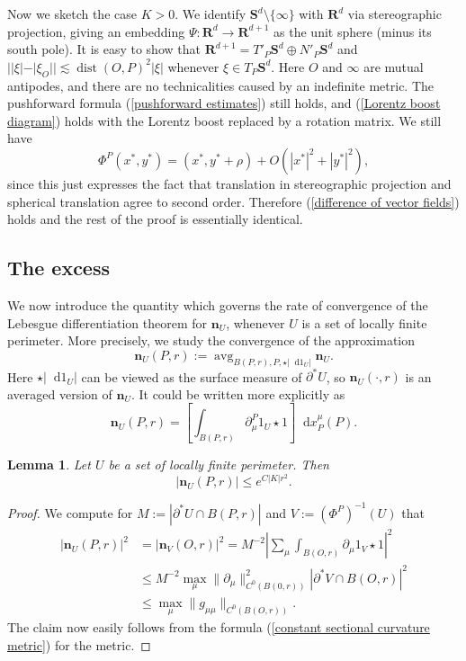 \documentclass[final,12pt, leqno]{brownthesis}
\newcommand{\RR}{\mathbf{R}}
\newcommand{\Sph}{\mathbf S}
\DeclareMathOperator{\avg}{avg}
\newcommand*\dif{\mathop{}\!\mathrm{d}}
\DeclareMathOperator{\dist}{dist}
\newcommand{\normal}{\mathbf n}
\newtheorem{lemma}[theorem]{Lemma}
\theoremstyle{definition}
\numberwithin{equation}{section}
\begin{document}
Now we sketch the case $K > 0$.
We identify $\Sph^d \setminus \{\infty\}$ with $\RR^d$ via stereographic projection, giving an embedding $\Psi: \RR^d \to \RR^{d + 1}$ as the unit sphere (minus its south pole).
It is easy to show that $\RR^{d + 1} = T'_P \Sph^d \oplus N'_P \Sph^d$ and $||\xi| - |\xi_O|| \lesssim \dist(O, P)^2 |\xi|$ whenever $\xi \in T_P \Sph^d$.
Here $O$ and $\infty$ are mutual antipodes, and there are no technicalities caused by an indefinite metric.
The pushforward formula (\ref{pushforward estimates}) still holds, and (\ref{Lorentz boost diagram}) holds with the Lorentz boost replaced by a rotation matrix.
We still have
$$\Phi^P(x^*, y^*) = (x^*, y^* + \rho) + O(|x^*|^2 + |y^*|^2),$$
since this just expresses the fact that translation in stereographic projection and spherical translation agree to second order.
Therefore (\ref{difference of vector fields}) holds and the rest of the proof is essentially identical.


\subsection{The excess}
We now introduce the quantity which governs the rate of convergence of the Lebesgue differentiation theorem for $\normal_U$, whenever $U$ is a set of locally finite perimeter.
More precisely, we study the convergence of the approximation
$$\normal_U(P, r) := \avg_{B(P, r), P, \star |\dif 1_U|} \normal_U.$$
Here $\star |\dif 1_U|$ can be viewed as the surface measure of $\partial^* U$, so $\normal_U(\cdot, r)$ is an averaged version of $\normal_U$.
It could be written more explicitly as
$$\normal_U(P, r) = \left[\int_{B(P, r)} \partial_\mu^P 1_U \star 1\right] \dif x_P^\mu(P).$$

\begin{lemma}\label{gauge invariance of the normal}
Let $U$ be a set of locally finite perimeter. Then
$$|\normal_U(P, r)| \leq e^{C|K|r^2}.$$
\end{lemma}
\begin{proof}
We compute for $M := |\partial^* U \cap B(P, r)|$ and $V := (\Phi^P)^{-1}(U)$ that
\begin{align*}
|\normal_U(P, r)|^2 &= |\normal_V(O, r)|^2 = M^{-2} \left|\sum_\mu \int_{B(O, r)} \partial_\mu 1_V \star 1\right|^2 \\
&\leq M^{-2} \max_\mu \|\partial_\mu\|_{C^0(B(0, r))}^2 |\partial^* V \cap B(O, r)|^2 \\
&\leq \max_\mu \|g_{\mu\mu}\|_{C^0(B(O, r))}.
\end{align*}
The claim now easily follows from the formula (\ref{constant sectional curvature metric}) for the metric.
\end{proof}
\end{document}

